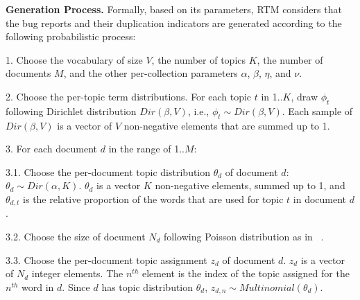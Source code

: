 
\vspace{0.03in}\noindent\textbf{Generation Process.}
Formally, based on its parameters, RTM considers that the bug reports
and their duplication indicators are generated according to the
following probabilistic process:


1. Choose the vocabulary of size $V$, the number of topics $K$, the
   number of documents $M$, and the other per-collection parameters
   $\alpha$, $\beta$, $\eta$, and $\nu$.

2. Choose the per-topic term distributions. For each topic $t$ in
1..$K$, draw $\phi_t$ following Dirichlet distribution
$Dir(\beta,V)$, i.e., $\phi_t \sim Dir(\beta,V)$. Each sample of
$Dir(\beta,V)$ is a vector of $V$ non-negative elements that are
summed up to 1.

3. For each document $d$ in the range of 1..$M$:

3.1. Choose the per-document topic distribution $\theta_d$ of document
     $d$: $\theta_d \sim Dir(\alpha, K)$. $\theta_d$ is a vector $K$
     non-negative elements, summed up to 1, and $\theta_{d,t}$ is the
     relative proportion of the words that are used for topic $t$ in
     document $d$.

3.2. Choose the size of document $N_d$ following Poisson
     distribution as in ~\cite{RTM}.

3.3. Choose the per-document topic assignment $z_d$ of document
     $d$. $z_d$ is a vector of $N_d$ integer elements. The $n^{th}$
     element is the index of the topic assigned for the $n^{th}$ word
     in $d$. Since $d$ has topic distribution $\theta_d$,
     $z_{d,n} \sim Multinomial(\theta_d)$.


